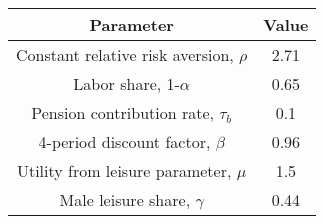 \begin{center}
	\begin{tabular}{ |c|c| } 
		
		Parameter & Value \\ 
		\hline
		Constant relative risk aversion, $\rho$ & 2.71\\
		Labor share, 1-$\alpha$ & 0.65\\
		Pension contribution rate, $\tau_b$ & 0.1\\
		4-period discount factor, $\beta$ & 0.96\\
		Utility from leisure parameter, $\mu$ & 1.5\\
		Male leisure share, $\gamma$ & 0.44 \\
		
	\end{tabular}
\end{center}




